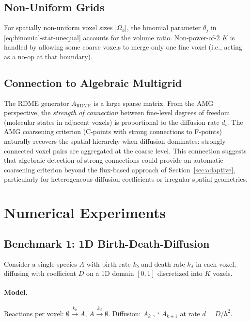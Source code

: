 \documentclass[review,onefignum,onetabnum]{siamart171218}
\begin{document}
\subsection{Non-Uniform Grids}

For spatially non-uniform voxel sizes $|\Omega_k|$, the
binomial parameter $\theta_j$ in
\eqref{eq:binomial-stat-unequal} accounts for the volume ratio.
Non-power-of-2 $K$ is handled by allowing some coarse voxels to
merge only one fine voxel (i.e., acting as a no-op at that
boundary).

\subsection{Connection to Algebraic Multigrid}

The RDME generator $A_{\mathrm{RDME}}$ is a large sparse matrix.
From the AMG perspective, the \emph{strength of connection}
between fine-level degrees of freedom (molecular states in
adjacent voxels) is proportional to the diffusion rate $d_i$.
The AMG coarsening criterion (C-points with strong connections to
F-points) naturally recovers the spatial hierarchy when diffusion
dominates: strongly-connected voxel pairs are aggregated at the
coarse level.  This connection suggests that algebraic detection
of strong connections could provide an automatic coarsening
criterion beyond the flux-based approach of
Section~\ref{sec:adaptive}, particularly for heterogeneous
diffusion coefficients or irregular spatial geometries.

\section{Numerical Experiments}
\label{sec:numerics}

\subsection{Benchmark 1: 1D Birth-Death-Diffusion}
\label{sec:bd-diffusion}

Consider a single species $A$ with birth rate $k_b$ and death
rate $k_d$ in each voxel, diffusing with coefficient $D$ on a
1D domain $[0,1]$ discretized into $K$ voxels.

\paragraph{Model.}
Reactions per voxel: $\emptyset \xrightarrow{k_b} A$,
$A \xrightarrow{k_d} \emptyset$.
Diffusion: $A_k \rightleftharpoons A_{k\pm 1}$ at rate $d = D/h^2$.
\end{document}
